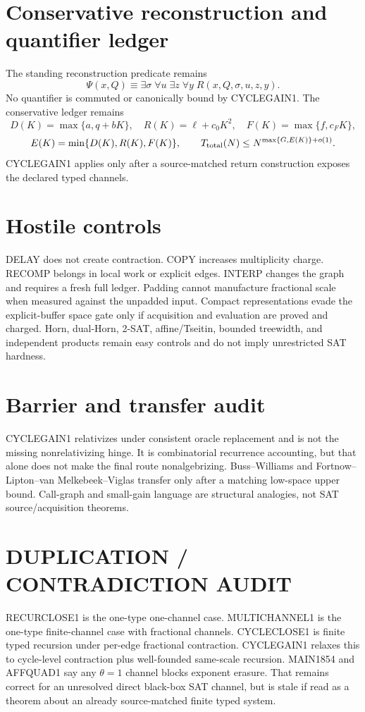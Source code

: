 \documentclass[11pt]{article}
\begin{document}
\section*{Conservative reconstruction and quantifier ledger}
The standing reconstruction predicate remains
\[
\Psi(x,Q)\equiv\exists\sigma\;\forall u\;\exists z\;\forall y\;R(x,Q,\sigma,u,z,y).
\]
No quantifier is commuted or canonically bound by CYCLEGAIN1. The conservative ledger remains
\[
D(K)=\max\{a,q+bK\},\quad R(K)=\ell+c_0K^2,\quad F(K)=\max\{f,c_FK\},
\]
\[
E(K)=\min\{D(K),R(K),F(K)\},\qquad T_{\rm total}(N)\le N^{\max\{G,E(K)\}+o(1)}.
\]
CYCLEGAIN1 applies only after a source-matched return construction exposes the declared typed channels.

\section*{Hostile controls}
DELAY does not create contraction. COPY increases multiplicity charge. RECOMP belongs in local work or explicit edges. INTERP changes the graph and requires a fresh full ledger. Padding cannot manufacture fractional scale when measured against the unpadded input. Compact representations evade the explicit-buffer space gate only if acquisition and evaluation are proved and charged. Horn, dual-Horn, 2-SAT, affine/Tseitin, bounded treewidth, and independent products remain easy controls and do not imply unrestricted SAT hardness.

\section*{Barrier and transfer audit}
CYCLEGAIN1 relativizes under consistent oracle replacement and is not the missing nonrelativizing hinge. It is combinatorial recurrence accounting, but that alone does not make the final route nonalgebrizing. Buss--Williams and Fortnow--Lipton--van Melkebeek--Viglas transfer only after a matching low-space upper bound. Call-graph and small-gain language are structural analogies, not SAT source/acquisition theorems.

\section*{DUPLICATION / CONTRADICTION AUDIT}
RECURCLOSE1 is the one-type one-channel case. MULTICHANNEL1 is the one-type finite-channel case with fractional channels. CYCLECLOSE1 is finite typed recursion under per-edge fractional contraction. CYCLEGAIN1 relaxes this to cycle-level contraction plus well-founded same-scale recursion. MAIN1854 and AFFQUAD1 say any \(\theta=1\) channel blocks exponent erasure. That remains correct for an unresolved direct black-box SAT channel, but is stale if read as a theorem about an already source-matched finite typed system.
\end{document}
